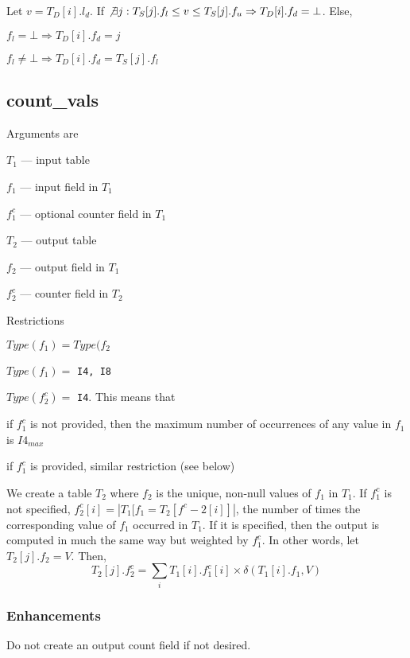 \documentclass{report}
\begin{document}
Let \(v = T_D[i].l_d\). If \(\not \exists j: T_S[j].f_l \leq v \leq
T_S[j].f_u \Rightarrow T_D[i].f_d = \bot\). Else, 
\bi
\item \(f_l = \bot \Rightarrow T_D[i].f_d = j\)
\item \(f_l \neq \bot \Rightarrow T_D[i].f_d = T_S[j].f_l\)
\ei



\subsection{count\_vals}
\label{count_vals}

Arguments are 
\be
\item \(T_1\) --- input table 
\item \(f_1\) --- input field  in \(T_1\)
\item \(f^c_1\) --- optional counter field in \(T_1\)
\item \(T_2\) --- output table 
\item \(f_2\) --- output field in \(T_1\)
\item \(f^c_2\) --- counter field in \(T_2\)
\ee

Restrictions
\be
\item \(Type(f_1) = Type(f_2\)
\item \(Type(f_1) = \) {\tt I4, I8}
\item \(Type(f^c_2) = \) {\tt I4}. This means that 
\be
\item if \(f^c_1\) is not provided, then the maximum number of 
occurrences of any value in \(f_1\) is \(I4_{max}\)
\item if \(f^c_1\) is provided, similar restriction (see below)
\ee
\ee

We create a table \(T_2\) where \(f_2\) is the unique, non-null values
of \(f_1\) in \(T_1\). If \(f^c_1\) is not specified, \(f^c_2[i] =
|T_1[f_1 = T_2[f^c-2[i]]|\), the number of times the corresponding
value of \(f_1\) occurred in \(T_1\). If it is specified, then the
output is computed in much the same way but weighted by \(f^c_1\). In
other words, let \(T_2[j].f_2 = V\). Then, 
\begin{displaymath}
T_2[j].f^c_2 = \sum_i T_1[i].f^c_1[i] \times \delta(T_1[i].f_1, V) 
\end{displaymath}

\subsubsection{Enhancements}
Do not create an output count field if not desired. %
\end{document}
